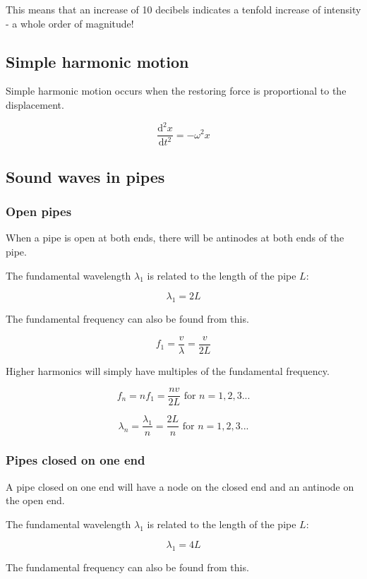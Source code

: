 \documentclass[12pt]{article}
\begin{document}
This means that an increase of 10 decibels indicates a tenfold increase of intensity - a whole order of magnitude!

\newpage

\subsection{Simple harmonic motion}

Simple harmonic motion occurs when the restoring force is proportional to the displacement.

\[
\boxed{
\frac{\mathrm{d}^2 x}{\mathrm{d}t^2} = -\omega^2 x
}
\]

\subsection{Sound waves in pipes}

\subsubsection{Open pipes}

When a pipe is open at both ends, there will be antinodes at both ends of the pipe.

The fundamental wavelength $\lambda_1$ is related to the length of the pipe $L$:

\[
\boxed{
\lambda_1 = 2L
}
\]

The fundamental frequency can also be found from this.

\[
\boxed{
f_1 = \frac{v}{\lambda} = \frac{v}{2L}
}
\]

Higher harmonics will simply have multiples of the fundamental frequency.

\[
\boxed{
f_n = nf_1 = \frac{nv}{2L}\text{ for }n = 1,2,3...
}
\]

\[
\boxed{
\lambda_n = \frac{\lambda_1}{n} = \frac{2L}{n}\text{ for }n = 1,2,3...
}
\]

\subsubsection{Pipes closed on one end}

A pipe closed on one end will have a node on the closed end and an antinode on the open end.

The fundamental wavelength $\lambda_1$ is related to the length of the pipe $L$:

\[
\boxed{
\lambda_1 = 4L
}
\]

The fundamental frequency can also be found from this.
\end{document}
